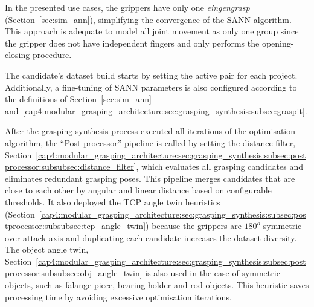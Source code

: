 In the presented use cases, the grippers have only one \textit{eingengrasp} (Section~\ref{sec:sim_ann}), simplifying the convergence of the \ac{SANN} algorithm. This approach is adequate to model all joint movement as only one group since the gripper does not have independent fingers and only performs the opening-closing procedure.


The candidate's dataset build starts by setting the active pair for each project. Additionally, a fine-tuning of \ac{SANN} parameters is also configured according to the definitions of Section~\ref{sec:sim_ann} and~\ref{cap4:modular_grasping_architecture:sec:grasping_synthesis:subsec:graspit}. 




After the grasping synthesis process executed all iterations of the optimisation algorithm, the ``Post-processor'' pipeline is called by setting the distance filter, Section~\ref{cap4:modular_grasping_architecture:sec:grasping_synthesis:subsec:postprocessor:subsubsec:distance_filter}, which evaluates all grasping candidates and eliminates redundant grasping poses. This pipeline merges candidates that are close to each other by angular and linear distance based on configurable thresholds. It also deployed the \ac{TCP} angle twin heuristics (Section~\ref{cap4:modular_grasping_architecture:sec:grasping_synthesis:subsec:postprocessor:subsubsec:tcp_angle_twin}) because the grippers are $180^o$ symmetric over attack axis and duplicating each candidate increases the dataset diversity. The object angle twin, Section~\ref{cap4:modular_grasping_architecture:sec:grasping_synthesis:subsec:postprocessor:subsubsec:obj_angle_twin} is also used in the case of symmetric objects, such as falange piece, bearing holder and rod objects. This heuristic saves processing time by avoiding excessive optimisation iterations.

